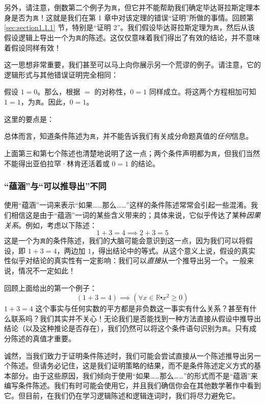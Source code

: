 另外，请注意，倒数第二个例子为\verb|真|，但它并不能帮助我们确定毕达哥拉斯定理本身是否为\verb|真|！这就是我们在第 1 章中对该定理的错误``证明''所做的事情。回顾第 \ref{sec:section1.1.1} 节，特别是``证明 2''。我们假设毕达哥拉斯定理为\verb|真|，然后从该假设逻辑上导出一个为\verb|真|的陈述。这仅仅意味着我们得出了有效的结论，并不意味着假设同样有效！

这一思想非常重要，我们甚至可以马上向你展示另一个荒谬的例子。请注意，它的逻辑形式与其他错误证明完全相同：

\begin{spoof}
    假设 $1 = 0$。那么，根据 $=$ 的对称性，$0 = 1$ 同样成立。将这两个方程相加可知 $1 = 1$，为\verb|真|。因此，$0 = 1$。
\end{spoof}

这里的要点是：
\begin{center}
    总体而言，知道条件陈述为\verb|真|，并不能告诉我们有关成分命题真值的\emph{任何}信息。
\end{center}
上面第三和第七个陈述也清楚地说明了这一点；两个条件声明都为\verb|真|，但我们当然不能得出亚伯拉罕·林肯还活着或 $0 = 1$ 的结论。

\subsubsection*{``蕴涵''与``可以推导出''不同}

使用``蕴涵''一词来表示``如果……那么……''这样的条件陈述常常会引起一些混淆。我们相信这是由于``蕴涵''一词的某些含义带来的；具体来说，它似乎传达了某种\emph{因果关系}。例如，考虑以下陈述：
\[1 + 3 = 4 \implies 2 + 3 = 5\]
这是一个为\verb|真|的条件陈述，我们的大脑可能会意识到这一点，因为我们可以将假设，即 $1 + 3 = 4$，两边加 $1$，得出结论中的等式。从这个意义上说，假设的真实性似乎对结论的真实性有一定影响：我们可以\emph{直接}从一个推导出另一个。一般来说，情况不一定如此！

回顾上面给出的第一个例子：
\[(1 + 3 = 4) \implies (\forall x \in \mathbb{R} \centerdot x^2 \ge 0)\]
$1+ 3 = 4$ 这个事实与任何实数的平方都是非负数这一事实有什么关系？甚至有什么联系吗？我们其实并不关心！无论我们是否能找到一种方法直接从假设中推导出结论（以及这种推论是否存在），我们仍然可以将这个条件语句识别为\verb|真|。只有成分陈述的真值才重要。

诚然，当我们致力于证明条件陈述时，我们可能会尝试直接从一个陈述推导出另一个陈述。但请务必记住，这是我们证明策略的结果，而不是条件陈述定义方式的基本部分。由于这些原因，我们倾向于使用``如果……那么……''的形式而不是``蕴涵''来编写条件陈述。我们有时可能会使用它，并且我们确信你会在其他数学著作中看到它。但目前，在我们仍在学习逻辑陈述和逻辑连词时，我们将尽力避免它。

